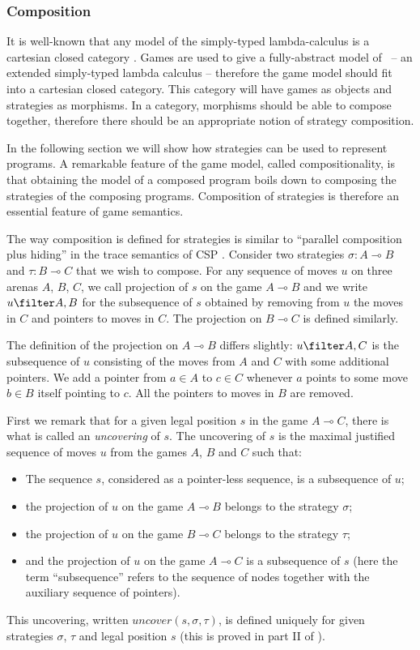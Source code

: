 \subsubsection{Composition}

It is well-known that any model of the simply-typed lambda-calculus
is a cartesian closed category \citep{CroleRL:catt}. Games are used
to give a fully-abstract model of \pcf\ -- an extended simply-typed
lambda calculus -- therefore the game model should fit into a
cartesian closed category. This category will have games as objects
and strategies as morphisms. In a category, morphisms should be able
to compose together, therefore there should be an appropriate notion
of strategy composition.

In the following section we will show how strategies can be used to
represent programs. A remarkable feature of the game model, called
compositionality, is that obtaining the model of a composed program
boils down to composing the strategies of the composing programs.
Composition of strategies is therefore an essential feature of game
semantics.


The way composition is defined for strategies is similar to
``parallel composition plus hiding'' in the trace semantics of CSP
\citep{hoare_csp}. Consider two strategies $\sigma : A \multimap B$
and $\tau : B \multimap C$ that we wish to compose. For any sequence
of moves $u$ on three arenas $A$, $B$, $C$, we call projection of
$s$ on the game $A \multimap B$ and we write $u \filter A,B$
for the subsequence of $s$ obtained by removing from $u$ the moves
in $C$ and pointers to moves in $C$. The projection on $B \multimap
C$ is defined similarly.

The definition of the projection on $A \multimap B$ differs
slightly: $u \filter A,C$ is the subsequence of $u$
consisting of the moves from $A$ and $C$ with some additional
pointers. We add a pointer from $a \in A$ to $c\in C$ whenever $a$
points to some move $b \in B$ itself pointing to $c$. All the
pointers to moves in $B$ are removed.


First we remark that for a given legal position $s$ in the game $A
\multimap C$, there is what is called an \emph{uncovering} of $s$.
The uncovering of $s$ is the maximal justified sequence of moves $u$
from the games $A$, $B$ and $C$ such that:
\begin{itemize}
\item The sequence $s$, considered as a pointer-less sequence, is a subsequence of
$u$;
\item the projection of $u$ on the game $A \multimap B$ belongs to the
strategy $\sigma$;
\item the projection of $u$ on the game $B \multimap C$ belongs
to the strategy $\tau$;
\item and the projection of $u$ on the game $A \multimap C$ is a subsequence of $s$ (here the term ``subsequence'' refers to the sequence of nodes together with the auxiliary sequence of pointers).
\end{itemize}
This uncovering, written $uncover(s, \sigma, \tau)$, is
defined uniquely for given strategies $\sigma$, $\tau$ and legal
position $s$ (this is proved in part II of \cite{hylandong_pcf}).

